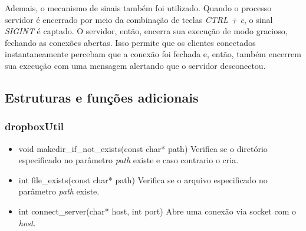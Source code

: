 \documentclass[a4paper]{article}
\begin{document}
Ademais, o mecanismo de sinais também foi utilizado. Quando o processo servidor é encerrado por meio da combinação de teclas \textit{CTRL + c}, o sinal \textit{SIGINT} é captado. O servidor, então, encerra sua execução de modo gracioso, fechando as conexões abertas. Isso permite que os clientes conectados instantaneamente percebam que a conexão foi fechada e, então, também encerrem sua execução com uma mensagem alertando que o servidor desconectou.

\subsection{Estruturas e funções adicionais}

\subsubsection{dropboxUtil}
\begin{itemize}
	\item void makedir\_if\_not\_exists(const char* path)
	\newline Verifica se o diretório especificado no parâmetro \textit{path} existe e caso contrario o cria.
	
	\item int file\_exists(const char* path)
	\newline Verifica se o arquivo especificado no parâmetro \textit{path} existe.

	\item int connect\_server(char* host, int port)
	\newline Abre uma conexão via socket com o \textit{host}.
\end{itemize}
\end{document}
